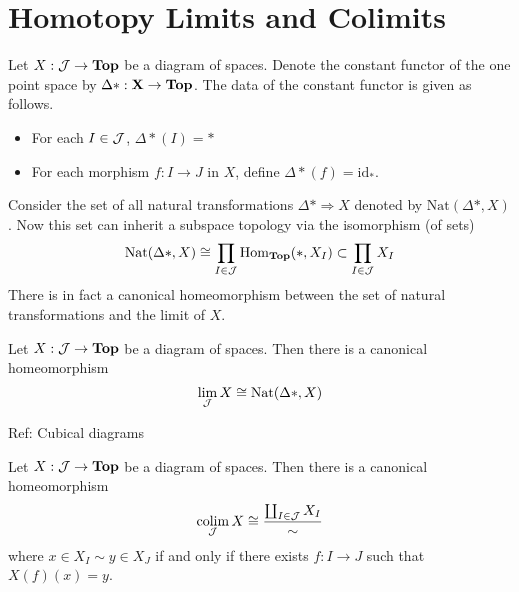 \documentclass[a4paper]{article}
\begin{document}
\pagebreak
\section{Homotopy Limits and Colimits}

Let $X:\mathcal{J}\to\bold{Top}$ be a diagram of spaces. Denote the constant functor of the one point space by $\Delta\ast:\bold{X}\to\bold{Top}$. The data of the constant functor is given as follows. 
\begin{itemize}
\item For each $I\in\mathcal{J}$, $\Delta\ast(I)=\ast$
\item For each morphism $f:I\to J$ in $X$, define $\Delta\ast(f)=\text{id}_\ast$. 
\end{itemize}
Consider the set of all natural transformations $\Delta\ast\Rightarrow X$ denoted by $\text{Nat}(\Delta\ast,X)$. Now this set can inherit a subspace topology via the isomorphism (of sets) $$\text{Nat}(\Delta\ast,X)\cong\prod_{I\in\mathcal{J}}\operatorname{Hom}_\bold{Top}(\ast,X_I)\subset\prod_{I\in\mathcal{J}}X_I$$ There is in fact a canonical homeomorphism between the set of natural transformations and the limit of $X$. 

\begin{thm}{}{} Let $X:\mathcal{J}\to\bold{Top}$ be a diagram of spaces. Then there is a canonical homeomorphism $$\lim_{\mathcal{J}} X\cong\text{Nat}(\Delta\ast,X)$$
\end{thm}
Ref: Cubical diagrams

\begin{thm}{}{} Let $X:\mathcal{J}\to\bold{Top}$ be a diagram of spaces. Then there is a canonical homeomorphism $$\operatorname*{colim}_{\mathcal{J}} X\cong\frac{\coprod_{I\in\mathcal{J}}X_I}{\sim}$$ where $x\in X_I\sim y\in X_J$ if and only if there exists $f:I\to J$ such that $X(f)(x)=y$. 
\end{thm}
\end{document}
